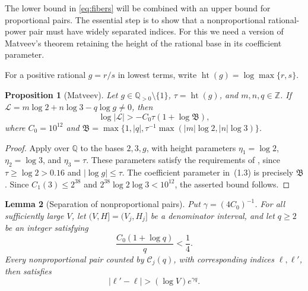 \documentclass[11pt,reqno]{amsart}
\theoremstyle{definition}
\newcommand{\Q}{\mathbb Q}
\newcommand{\Z}{\mathbb Z}
\theoremstyle{plain}
\newtheorem{lemma}{Lemma}[section]
\newtheorem{proposition}[lemma]{Proposition}
\theoremstyle{definition}
\theoremstyle{remark}
\newcommand{\htq}{\operatorname{ht}}
\begin{document}
The lower bound in \eqref{eq:fibers} will be
combined with an upper bound for proportional
pairs. The essential step is to show that a
nonproportional rational-power pair must have
widely separated indices. For this we need
a version of Matveev's theorem retaining the
height of the rational base in its coefficient
parameter.

For a positive rational $g=r/s$ in lowest terms,
write $\htq(g)=\log\max\{r,s\}$.

\begin{proposition}[Matveev]\label{prop:matveev}
Let $g\in\Q_{>0}\setminus\{1\}$,
$\tau=\htq(g)$, and $m,n,q\in\Z$.
If $\mathcal L=m\log2+n\log3-q\log g\ne0$, then
\begin{equation}\label{eq:matveev}
\log|\mathcal L|>
-C_0\tau(1+\log\mathfrak B),
\end{equation}
where $C_0=10^{12}$ and
$\mathfrak B=\max\{1,|q|,
\tau^{-1}\max(|m|\log2,|n|\log3)\}$.
\end{proposition}

\begin{proof}
Apply \cite[p.~1218, (1.3), and p.~1219, Corollary~2.3, (2.6)]{Matveev} over $\mathbb Q$ to the bases $2,3,g$, with height parameters $\eta_1=\log 2$, $\eta_2=\log 3$, and $\eta_3=\tau$. These parameters satisfy the requirements of \cite[(2.4)]{Matveev}, since
$\tau\ge\log 2>0.16$ and $|\log g|\le\tau$. The coefficient parameter in~(1.3) is precisely $\mathfrak B$. Since $C_1(3)\le 2^{38}$ and $2^{38}\log 2\log 3<10^{12}$, the asserted bound follows.
\end{proof}

\begin{lemma}[Separation of nonproportional pairs]
\label{lem:gap}
Put $\gamma=(4C_0)^{-1}$. For all sufficiently
large $V$, let $(V,H]=(V_j,H_j]$ be a denominator
interval, and let $q\ge2$ be an integer satisfying
\begin{equation}\label{eq:q-admissible}
 \frac{C_0(1+\log q)}q<\frac14.
\end{equation}
Every nonproportional pair counted by
$\mathcal C_j(q)$, with corresponding indices
$\ell,\ell'$, then satisfies
\begin{equation}\label{eq:gap}
 |\ell'-\ell|>(\log V)e^{\gamma q}.
\end{equation}
\end{lemma}
\end{document}
